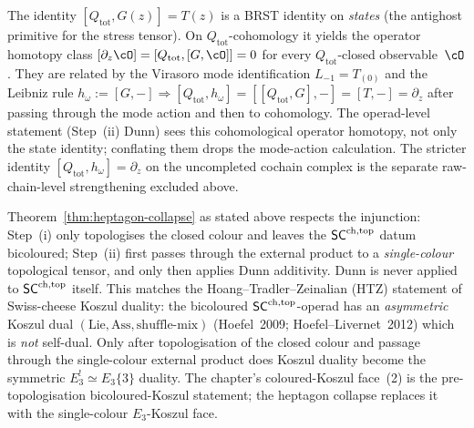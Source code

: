 \begin{remark}\label{rem:h-omega-vs-G-primitive}%
%
%
The identity $[Q_{\mathrm{tot}},G(z)]=T(z)$ is a BRST identity on
\emph{states} (the antighost primitive for the stress tensor). On
$Q_{\mathrm{tot}}$-cohomology it yields the operator homotopy class
$[\partial_z\cO]=[Q_{\mathrm{tot}},[G,\cO]]=0$ for every
$Q_{\mathrm{tot}}$-closed observable~$\cO$. They are related by the
Virasoro mode identification $L_{-1}=T_{(0)}$ and the Leibniz rule
$h_\omega:=[G,-]\Rightarrow[Q_{\mathrm{tot}},h_\omega]
 =[[Q_{\mathrm{tot}},G],-]=[T,-]=\partial_z$ after passing through
the mode action and then to cohomology. The operad-level statement
(Step~(ii) Dunn) sees this cohomological operator homotopy, not only
the state identity; conflating them drops the mode-action
calculation. The stricter identity
$[Q_{\mathrm{tot}},h_\omega]=\partial_z$ on the uncompleted cochain
complex is the separate raw-chain-level strengthening excluded
above.
\end{remark}

\begin{remark}\label{rem:heptagon-collapse-bicoloured-scope}%
%
%
Theorem~\ref{thm:heptagon-collapse} as stated above respects the
injunction: Step~(i) only topologises the closed colour and leaves the
$\mathsf{SC}^{\mathrm{ch},\mathrm{top}}$ datum bicoloured; Step~(ii) first passes through the
external product to a \emph{single-colour} topological tensor, and only
then applies Dunn additivity. Dunn is never applied to $\mathsf{SC}^{\mathrm{ch},\mathrm{top}}$
itself. This matches the Hoang--Tradler--Zeinalian
(HTZ) statement of Swiss-cheese Koszul duality: the bicoloured
$\mathsf{SC}^{\mathrm{ch},\mathrm{top}}$-operad has an \emph{asymmetric} Koszul dual
$\mathrm{(Lie,Ass,\text{shuffle-mix})}$ (Hoefel~2009;
Hoefel--Livernet~2012) which is \emph{not} self-dual.
Only after topologisation of the closed colour and passage through the
single-colour external product does Koszul duality become the symmetric
$E_3^!\simeq E_3\{3\}$ duality. The chapter's coloured-Koszul
face~(2) is the pre-topologisation bicoloured-Koszul statement; the
heptagon collapse replaces it with the single-colour $E_3$-Koszul face.
\end{remark}

